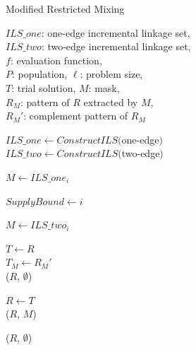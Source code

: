 

\begin{algorithm}[th!]
\caption{Modified Restricted Mixing}\label{algo_disjdecomp}

$ILS\_one$: one-edge incremental linkage set,\\
$ILS\_two$: two-edge incremental linkage set,\\
$f$: evaluation function, \\
$P$: population, $\ell$: problem size, \\
$T$: trial solution, $M$: mask, \\
${R_M}$: pattern of $R$ extracted by $M$, \\
${R_M}'$: complement pattern of ${R_M}$



\BlankLine
$ILS\_one  \leftarrow ConstructILS($one-edge$)$\\
$ILS\_two  \leftarrow ConstructILS($two-edge$)$
\BlankLine
{} {
    $M \leftarrow ILS\_one_i$ \\
     {
        $ SupplyBound \leftarrow i$
       
    }
}

\BlankLine
{} {

    $M \leftarrow ILS\_two_i$ \\

     {

        $T \leftarrow R$ \\
        $T_M \leftarrow {R_M}'$ \\

         {
            \Return ($R$, $\emptyset$) 
        }

         {
            $R \leftarrow T$ \\
            \Return ($R$, $M$)
        }
    }
}
\Return ($R$, $\emptyset$) 
\end{algorithm}


